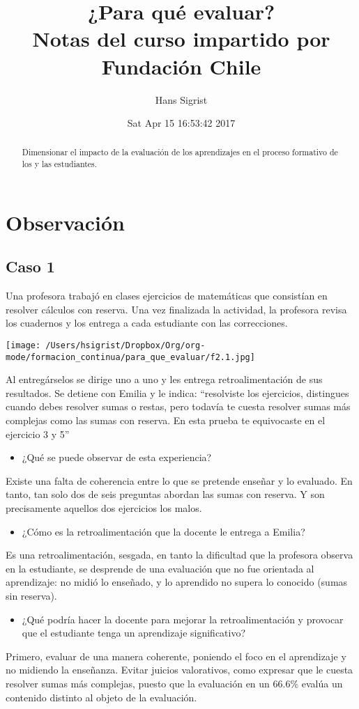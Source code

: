 \documentclass[12pt,letterpaper,article,x11names]{memoir}
\title{}
\author{Hans Sigrist}
\date{Sat Apr 15 16:53:42 2017}
\title{¿Para qué evaluar?\\\medskip
\large Notas del curso impartido por Fundación Chile}
\begin{document}
\maketitle
\begin{abstract}
Dimensionar el impacto de la evaluación de los aprendizajes en el proceso formativo de los y las estudiantes.
\end{abstract}



\setcounter{tocdepth}{3}
\tableofcontents

\chapter{Observación}
\label{sec:orgf8af30c}
\section{Caso 1}
\label{sec:orgaabafbf}
Una profesora trabajó en clases ejercicios de matemáticas que consistían en resolver cálculos con reserva. Una vez finalizada la actividad, la profesora revisa los cuadernos y los entrega a cada estudiante con las correcciones. 

\begin{center}
\texttt{[image: /Users/hsigrist/Dropbox/Org/org-mode/formacion\_continua/para\_que\_evaluar/f2.1.jpg]}
\end{center}

Al entregárselos se dirige uno a uno y les entrega retroalimentación de sus resultados. Se detiene con Emilia y le indica: “resolviste los ejercicios, distingues cuando debes resolver sumas o restas, pero todavía te cuesta resolver sumas más complejas como las sumas con reserva. En esta prueba te equivocaste en el ejercicio 3 y 5”

\begin{itemize}
\item ¿Qué se puede observar de esta experiencia?
\end{itemize}
Existe una falta de coherencia entre lo que se pretende enseñar y lo evaluado. En tanto, tan solo dos de seis preguntas abordan las sumas con reserva. Y son precisamente aquellos dos ejercicios los malos.  
\begin{itemize}
\item ¿Cómo es la retroalimentación que la docente le entrega a Emilia?
\end{itemize}
Es una retroalimentación, sesgada, en tanto la dificultad que la profesora observa en la estudiante, se desprende de una evaluación que no fue orientada al aprendizaje: no midió lo enseñado, y lo aprendido no supera lo conocido (sumas sin reserva).
\begin{itemize}
\item ¿Qué podría hacer la docente para mejorar la retroalimentación y provocar que el estudiante tenga un aprendizaje significativo?
\end{itemize}
Primero, evaluar de una manera coherente, poniendo el foco en el aprendizaje y no midiendo la enseñanza. Evitar juicios valorativos, como expresar que le cuesta resolver sumas más complejas, puesto que la evaluación en un 66.6\% evalúa un contenido distinto al objeto de la evaluación.
\end{document}
